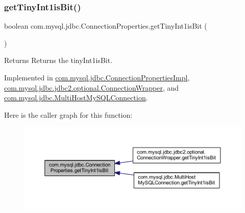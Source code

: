 \subsubsection{\texorpdfstring{get\+Tiny\+Int1is\+Bit()}{getTinyInt1isBit()}}
{\footnotesize\ttfamily boolean com.\+mysql.\+jdbc.\+Connection\+Properties.\+get\+Tiny\+Int1is\+Bit (\begin{DoxyParamCaption}{ }\end{DoxyParamCaption})}

\begin{DoxyReturn}{Returns}
Returns the tiny\+Int1is\+Bit. 
\end{DoxyReturn}


Implemented in \mbox{\hyperlink{classcom_1_1mysql_1_1jdbc_1_1_connection_properties_impl_a3576357d3959c1343a9d36aea30e6640}{com.\+mysql.\+jdbc.\+Connection\+Properties\+Impl}}, \mbox{\hyperlink{classcom_1_1mysql_1_1jdbc_1_1jdbc2_1_1optional_1_1_connection_wrapper_a0c0c590343b7fce7d02e4293a92d4cb8}{com.\+mysql.\+jdbc.\+jdbc2.\+optional.\+Connection\+Wrapper}}, and \mbox{\hyperlink{classcom_1_1mysql_1_1jdbc_1_1_multi_host_my_s_q_l_connection_a94faebe8a08ecfceb521766576703f02}{com.\+mysql.\+jdbc.\+Multi\+Host\+My\+S\+Q\+L\+Connection}}.

Here is the caller graph for this function\+:\nopagebreak
\begin{figure}[H]
\begin{center}
\leavevmode
\includegraphics[width=350pt]{interfacecom_1_1mysql_1_1jdbc_1_1_connection_properties_a3bde53c87aba637f1e0833d504e96742_icgraph}
\end{center}
\end{figure}
\mbox{\label{interfacecom_1_1mysql_1_1jdbc_1_1_connection_properties_ac91e629cc7505335e1de76be5d070102}} 
